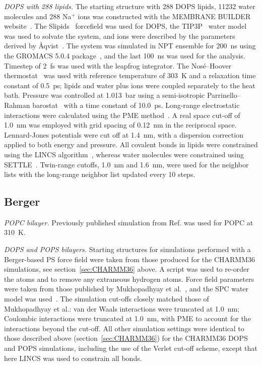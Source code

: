 \documentclass[journal=jpcbfk,manuscript=article]{achemso}
\newcommand{\todo}[1]{\textcolor{red}{#1}}
\begin{document}
\noindent
{\it DOPS with 288 lipids.}
The starting structure with 288 DOPS lipids, 11232 water molecules and 288 Na$^+$ ions
was constructed with the MEMBRANE BUILDER website~\cite{ghahremanpour13}.
The Slipids~\cite{jambeck13} forcefield was used for DOPS, the TIP3P~\cite{jorgensen83} water model was used to solvate the system, and
ions were described by the parameters derived by \AA{}qvist~\cite{aqvist90}.
The system was simulated in NPT ensemble for 200~ns using the GROMACS 5.0.4 package~\cite{abraham2015gromacs},
and the last 100~ns was used for the analysis.
Timestep of 2~fs was used with the leapfrog integrator. The Nos\'{e}--Hoover thermostat~\cite{nose84,hoover85} was used with reference temperature of 303~K and a relaxation time constant of 0.5~ps; lipids and water plus ions were coupled separately to the heat bath. Pressure was controlled at 1.013~bar using a semi-isotropic Parrinello--Rahman
barostat~\cite{parrinello81} with a time constant of 10.0~ps. Long-range electrostatic interactions were calculated using the PME method~\cite{darden93,essman95}. A real space cut-off of 1.0~nm was employed with grid spacing of 0.12~nm in the reciprocal space. Lennard-Jones potentials were cut off at 1.4~nm, with a dispersion correction applied to both energy and pressure. All covalent bonds in lipids were constrained using the LINCS algorithm~\cite{hess97}, whereas water molecules were constrained using SETTLE~\cite{miyamoto92}. Twin-range cutoffs, 1.0~nm and 1.6~nm, were used for the neighbor lists with the long-range neighbor list updated every 10 steps.


\subsection{Berger}
\noindent
{\it POPC bilayer.} 
Previously published simulation \cite{ollila07a} from Ref. 
was used for POPC at 310~K.

\noindent
{\it DOPS and POPS bilayers.} 
Starting structures for %
simulations performed with a Berger-based PS force field
were taken from those produced for the CHARMM36 simulations, see section~\ref{sec:CHARMM36} above. A script was used to re-order the
atoms and to remove any extraneous hydrogen atoms. Force field parameters were taken from those
published by Mukhopadhyay et al.~\cite{mukhopadhyay04},
and the SPC water model was used~\cite{berendsen81}. The simulation cut-offs closely matched
those of Mukhopadhyay et al.: van der Waals interactions were truncated at 1.0~nm;
Coulombic interactions were truncated at 1.0~nm, with PME to account for the interactions beyond the cut-off.
All other simulation settings were identical to those described above (section~\ref{sec:CHARMM36}) for the CHARMM36 DOPS and POPS simulations,
including the use of the Verlet cut-off scheme, except that here LINCS was used to constrain all bonds.
\end{document}
